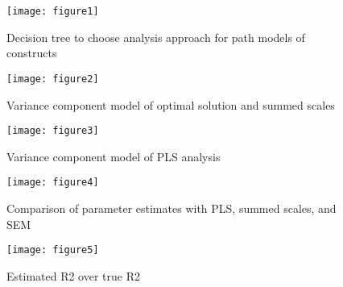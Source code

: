 \documentclass[10pt]{report}
\begin{document}
%
%

\begin{figure}[h!]
\centering
\texttt{[image: figure1]}
\caption{Decision tree to choose analysis approach for path models of constructs}
\end{figure}

\begin{figure}[h!]
\centering
\texttt{[image: figure2]}
\caption{Variance component model of optimal solution and summed scales}
\end{figure}

\begin{figure}[h!]
\centering
\texttt{[image: figure3]}
\caption{Variance component model of PLS analysis}
\end{figure}

\begin{figure}[h!]
\centering
\texttt{[image: figure4]}
\caption{Comparison of parameter estimates with PLS, summed scales, and  SEM}
\end{figure}

\begin{figure}[h!]
\centering
\texttt{[image: figure5]}
\caption{Estimated R2 over true R2}
\end{figure}


%
%

\end{document}
